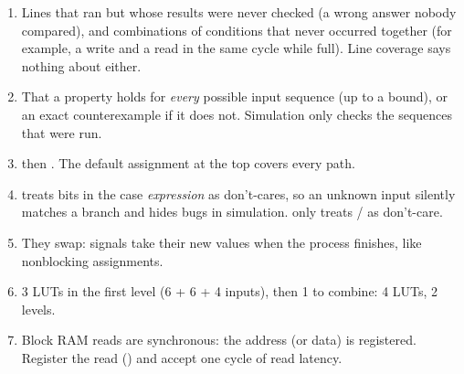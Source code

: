 \begin{enumerate}
  \item Lines that ran but whose results were never checked (a wrong answer nobody compared), and combinations of conditions that never occurred together (for example, a write and a read in the same cycle while full). Line coverage says nothing about either.
  \item That a property holds for \emph{every} possible input sequence (up to a bound), or an exact counterexample if it does not. Simulation only checks the sequences that were run.
  \item {} then . The default assignment at the top covers every path.
  \item {} treats  bits in the case \emph{expression} as don't-cares, so an unknown input silently matches a branch and hides bugs in simulation.  only treats / as don't-care.
  \item They swap: signals take their new values when the process finishes, like nonblocking assignments.
  \item 3 LUTs in the first level (6 + 6 + 4 inputs), then 1 to combine: 4 LUTs, 2 levels.
  \item Block RAM reads are synchronous: the address (or data) is registered. Register the read () and accept one cycle of read latency.
\end{enumerate}
